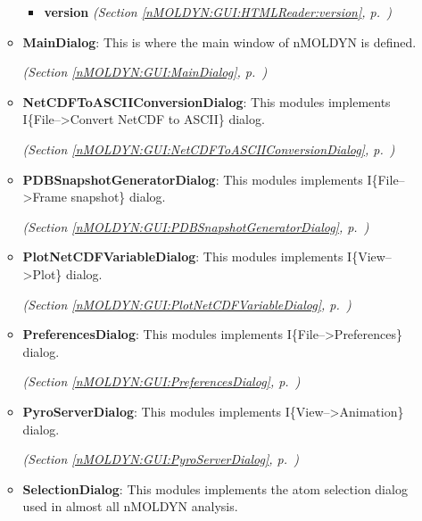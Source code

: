 \begin{itemize}
\begin{itemize}
\begin{itemize}
        \item \textbf{version}
  \textit{(Section \ref{nMOLDYN:GUI:HTMLReader:version}, p.~\pageref{nMOLDYN:GUI:HTMLReader:version})}

      \end{itemize}
    \item \textbf{MainDialog}: This is where the main window of nMOLDYN is defined.



  \textit{(Section \ref{nMOLDYN:GUI:MainDialog}, p.~\pageref{nMOLDYN:GUI:MainDialog})}

    \item \textbf{NetCDFToASCIIConversionDialog}: This modules implements I\{File--{\textgreater}Convert NetCDF to ASCII\} dialog.



  \textit{(Section \ref{nMOLDYN:GUI:NetCDFToASCIIConversionDialog}, p.~\pageref{nMOLDYN:GUI:NetCDFToASCIIConversionDialog})}

    \item \textbf{PDBSnapshotGeneratorDialog}: This modules implements I\{File--{\textgreater}Frame snapshot\} dialog.



  \textit{(Section \ref{nMOLDYN:GUI:PDBSnapshotGeneratorDialog}, p.~\pageref{nMOLDYN:GUI:PDBSnapshotGeneratorDialog})}

    \item \textbf{PlotNetCDFVariableDialog}: This modules implements I\{View--{\textgreater}Plot\} dialog.



  \textit{(Section \ref{nMOLDYN:GUI:PlotNetCDFVariableDialog}, p.~\pageref{nMOLDYN:GUI:PlotNetCDFVariableDialog})}

    \item \textbf{PreferencesDialog}: This modules implements I\{File--{\textgreater}Preferences\} dialog.



  \textit{(Section \ref{nMOLDYN:GUI:PreferencesDialog}, p.~\pageref{nMOLDYN:GUI:PreferencesDialog})}

    \item \textbf{PyroServerDialog}: This modules implements I\{View--{\textgreater}Animation\} dialog.



  \textit{(Section \ref{nMOLDYN:GUI:PyroServerDialog}, p.~\pageref{nMOLDYN:GUI:PyroServerDialog})}

    \item \textbf{SelectionDialog}: This modules implements the atom selection dialog used in almost all nMOLDYN analysis.




\end{itemize}
\end{itemize}
